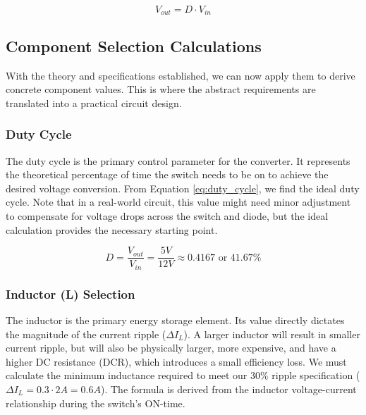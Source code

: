 \documentclass[12pt, a4paper]{article}
\begin{document}
\begin{equation}

V_{out} = D \cdot V_{in}

\label{eq:duty_cycle}

\end{equation}



\subsection{Component Selection Calculations}

With the theory and specifications established, we can now apply them to derive concrete component values. This is where the abstract requirements are translated into a practical circuit design.



\subsubsection{Duty Cycle}

The duty cycle is the primary control parameter for the converter. It represents the theoretical percentage of time the switch needs to be on to achieve the desired voltage conversion. From Equation \ref{eq:duty_cycle}, we find the ideal duty cycle. Note that in a real-world circuit, this value might need minor adjustment to compensate for voltage drops across the switch and diode, but the ideal calculation provides the necessary starting point.

$$ D = \frac{V_{out}}{V_{in}} = \frac{5V}{12V} \approx 0.4167 \text{ or } 41.67\% $$



\subsubsection{Inductor (L) Selection}

The inductor is the primary energy storage element. Its value directly dictates the magnitude of the current ripple ($\Delta I_L$). A larger inductor will result in smaller current ripple, but will also be physically larger, more expensive, and have a higher DC resistance (DCR), which introduces a small efficiency loss. We must calculate the minimum inductance required to meet our 30\% ripple specification ($\Delta I_L = 0.3 \cdot 2A = 0.6A$). The formula is derived from the inductor voltage-current relationship during the switch's ON-time.
\end{document}
